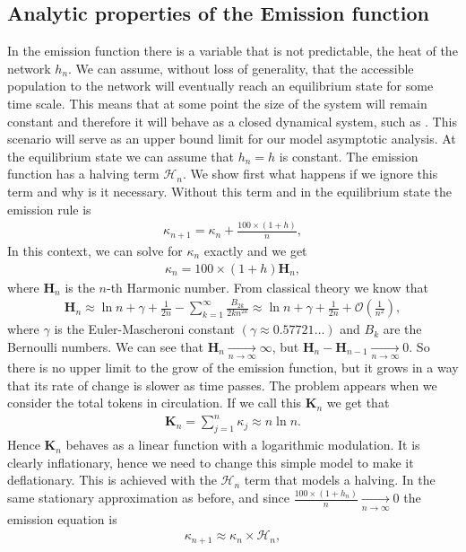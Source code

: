 \documentclass[11pt]{amsart}
\numberwithin{equation}{section}
\theoremstyle{definition}
\theoremstyle{remark}
\renewcommand{\_}[1]{_{\left( #1 \right)}}
\renewcommand{\^}[1]{^{\left( #1 \right)}}
\begin{document}
\subsection{Analytic properties of the Emission function}
In the emission function there is a variable that is not predictable, the heat of the network $h_n$. We can assume, without loss of generality, that the accessible population to the network will eventually reach an equilibrium state for some time scale. This means that at some point the size of the system will remain constant and therefore it will behave as a closed dynamical system, such as \cite{kermack,peruanisibona,verhulst}. This scenario will serve as an upper bound limit for our model asymptotic analysis. At the equilibrium state we can assume that $h_n = h$ is constant.
The emission function has a halving term $\mathcal{H}_n$. We show first what happens if we ignore this term and why is it necessary. Without this term and in the equilibrium state the emission rule is
\begin{align*}
\kappa_{n+1} = \kappa_n  + \frac{100\times (1+ h)}{n},
\end{align*}
In this context, we can solve for $\kappa_n$ exactly and we get
\begin{align*}
\kappa_n = 100\times (1+ h) \mathbf{H}_n, 
\end{align*}
where $\mathbf{H}_n$ is the $n$-th Harmonic number. From classical theory we know that
\begin{align*}
\mathbf{H}_n \approx \ln n + \gamma + \frac{1}{2n} - \sum_{k=1}^{\infty}\frac{B_{2k}}{2k n^{2k}} \approx \ln n + \gamma + \frac{1}{2n} + \mathcal{O}\left(\frac{1}{n^2}\right),
\end{align*}
where $\gamma$ is the Euler-Mascheroni constant $(\gamma \approx 0.57721\dots)$ and $B_k$ are the Bernoulli numbers. We can see that $\mathbf{H}_n \xrightarrow[n\rightarrow \infty]{} \infty$, but $\mathbf{H}_n - \mathbf{H}_{n-1} \xrightarrow[n\rightarrow \infty]{} 0$. So there is no upper limit to the grow of the emission function, but it grows in a way that its rate of change is slower as time passes. The problem appears when we consider the total tokens in circulation. If we call this $\mathbf{K}_n$ we get that
\begin{align*}
\mathbf{K}_n = \sum_{j=1}^n \kappa_j \approx n \ln n.
\end{align*}  
Hence $\mathbf{K}_n$ behaves as a linear function with a logarithmic modulation. It is clearly inflationary, hence we need to change this simple model to make it deflationary. This is achieved with the $\mathcal{H}_n$ term that models a halving. In the same stationary approximation as before, and since $\frac{100\times (1+ h_n)}{n}  \xrightarrow[n\rightarrow \infty]{} 0$ the emission equation is
\begin{align*}
\kappa_{n+1} \approx \kappa_n \times \mathcal{H}_n,
\end{align*}
\end{document}
